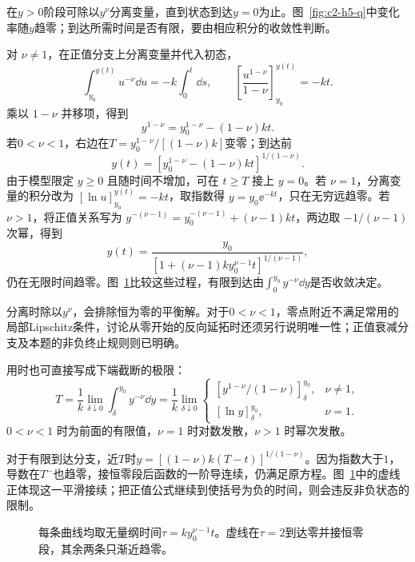 \begin{solution}
在$y>0$阶段可除以$y^\nu$分离变量，直到状态到达$y=0$为止。图~\ref{fig:c2-h5-q}中变化率随$y$趋零；到达所需时间是否有限，要由相应积分的收敛性判断。


对 $\nu\ne1$，在正值分支上分离变量并代入初态，
\[
\int_{y_0}^{y(t)}u^{-\nu}\dd u=-k\int_0^t\dd s,\qquad
\left[\frac{u^{1-\nu}}{1-\nu}\right]_{y_0}^{y(t)}=-kt.
\]
乘以 $1-\nu$ 并移项，得到
\[y^{1-\nu}=y_0^{1-\nu}-(1-\nu)kt.
\]
若$0<\nu<1$，右边在$T=y_0^{1-\nu}/[(1-\nu)k]$变零；到达前
\[y(t)=[y_0^{1-\nu}-(1-\nu)kt]^{1/(1-\nu)}.
\]
由于模型限定 $y\ge0$ 且随时间不增加，可在 $t\ge T$ 接上 $y=0$。若 $\nu=1$，分离变量的积分改为 $[\ln u]_{y_0}^{y(t)}=-kt$，取指数得 $y=y_0\ee^{-kt}$，只在无穷远趋零。若 $\nu>1$，将正值关系写为 $y^{-(\nu-1)}=y_0^{-(\nu-1)}+(\nu-1)kt$，两边取 $-1/(\nu-1)$ 次幂，得到
\[y(t)=\frac{y_0}{[1+(\nu-1)ky_0^{\nu-1}t]^{1/(\nu-1)}},
\]
仍在无限时间趋零。图~\ref{fig:c2-h5-s}比较这些过程，有限到达由$\int_0^{y_0}y^{-\nu}\dd y$是否收敛决定。

分离时除以$y^\nu$，会排除恒为零的平衡解。对于$0<\nu<1$，零点附近不满足常用的局部Lipschitz条件，讨论从零开始的反向延拓时还须另行说明唯一性；正值衰减分支及本题的非负终止规则则已明确。


用时也可直接写成下端截断的极限：
\[
T=\frac1k\lim_{\delta\downarrow0}\int_\delta^{y_0}y^{-\nu}\dd y
=\frac1k\lim_{\delta\downarrow0}
\begin{cases}[y^{1-\nu}/(1-\nu)]_\delta^{y_0},&\nu\ne1,\\
[\ln y]_\delta^{y_0},&\nu=1.
\end{cases}
\]
$0<\nu<1$ 时为前面的有限值，$\nu=1$ 时对数发散，$\nu>1$ 时幂次发散。

对于有限到达分支，近$T$时$y=[(1-\nu)k(T-t)]^{1/(1-\nu)}$。因为指数大于$1$，导数在$T^-$也趋零，接恒零段后函数的一阶导连续，仍满足原方程。图~\ref{fig:c2-h5-s}中的虚线正体现这一平滑接续；把正值公式继续到使括号为负的时间，则会违反非负状态的限制。

\begin{figure}[H]\centering
{}
\caption{每条曲线均取无量纲时间$\tau=ky_0^{\nu-1}t$。虚线在$\tau=2$到达零并接恒零段，其余两条只渐近趋零。}\label{fig:c2-h5-s}
\end{figure}
\end{solution}

